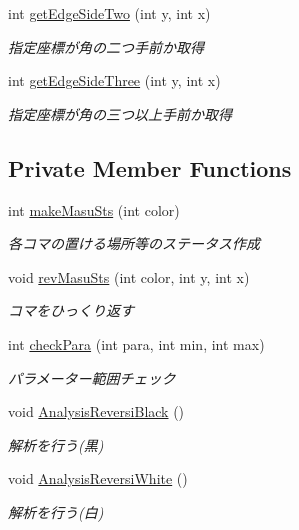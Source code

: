 \begin{DoxyCompactItemize}
int \hyperlink{classjp_1_1gr_1_1java__conf_1_1yuta__yoshinaga_1_1reversi_1_1model_1_1_reversi_afc0b642f56e39a28ab5adc48c8fd2b98}{get\+Edge\+Side\+Two} (int y, int x)
\begin{DoxyCompactList}\small\item\em 指定座標が角の二つ手前か取得 \end{DoxyCompactList}\item 
int \hyperlink{classjp_1_1gr_1_1java__conf_1_1yuta__yoshinaga_1_1reversi_1_1model_1_1_reversi_a296b35d2241e6b3cff31bcb199c3d9aa}{get\+Edge\+Side\+Three} (int y, int x)
\begin{DoxyCompactList}\small\item\em 指定座標が角の三つ以上手前か取得 \end{DoxyCompactList}\end{DoxyCompactItemize}
\subsection*{Private Member Functions}
\begin{DoxyCompactItemize}
\item 
int \hyperlink{classjp_1_1gr_1_1java__conf_1_1yuta__yoshinaga_1_1reversi_1_1model_1_1_reversi_a9929ed36140ddc25923ede99f86564c3}{make\+Masu\+Sts} (int color)
\begin{DoxyCompactList}\small\item\em 各コマの置ける場所等のステータス作成 \end{DoxyCompactList}\item 
void \hyperlink{classjp_1_1gr_1_1java__conf_1_1yuta__yoshinaga_1_1reversi_1_1model_1_1_reversi_a3c63579c27513dffc555416388f8530a}{rev\+Masu\+Sts} (int color, int y, int x)
\begin{DoxyCompactList}\small\item\em コマをひっくり返す \end{DoxyCompactList}\item 
int \hyperlink{classjp_1_1gr_1_1java__conf_1_1yuta__yoshinaga_1_1reversi_1_1model_1_1_reversi_afbad8b2c3b2423a7490f9a3b636584d3}{check\+Para} (int para, int min, int max)
\begin{DoxyCompactList}\small\item\em パラメーター範囲チェック \end{DoxyCompactList}\item 
void \hyperlink{classjp_1_1gr_1_1java__conf_1_1yuta__yoshinaga_1_1reversi_1_1model_1_1_reversi_adb74246f49150e02201766a1fa6cf732}{Analysis\+Reversi\+Black} ()
\begin{DoxyCompactList}\small\item\em 解析を行う(黒) \end{DoxyCompactList}\item 
void \hyperlink{classjp_1_1gr_1_1java__conf_1_1yuta__yoshinaga_1_1reversi_1_1model_1_1_reversi_a519adbc5ec3bf5433fdb79bf8049cc75}{Analysis\+Reversi\+White} ()
\begin{DoxyCompactList}\small\item\em 解析を行う(白) \end{DoxyCompactList}\end{DoxyCompactItemize}
